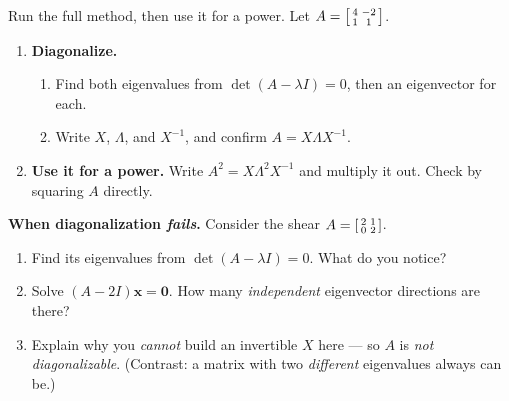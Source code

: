 \documentclass[10pt]{article}
\newcommand{\xx}{\mathbf{x}}
\newcommand{\zero}{\mathbf{0}}
\begin{document}
\begin{tcolorbox}[colback=white, colframe=black!40, title=\textbf{Tier A --- Approaching Proficiency},
    fonttitle=\bfseries, arc=1.5mm, left=3mm, right=3mm, top=2mm, bottom=2mm, breakable]
Run the full method, then use it for a power. Let $A=\begin{bsmallmatrix} 4 & -2\\ 1 & 1 \end{bsmallmatrix}$.
\begin{enumerate}[leftmargin=1.7em, itemsep=9pt]
  \item \textbf{Diagonalize.}
        \begin{enumerate}[label=(\alph*), leftmargin=1.7em, itemsep=3pt]
          \item Find both eigenvalues from $\det(A-\lambda I)=0$, then an eigenvector for each.
          \item Write $X$, $\Lambda$, and $X^{-1}$, and confirm $A=X\Lambda X^{-1}$.
        \end{enumerate}
  \item \textbf{Use it for a power.} Write $A^2=X\Lambda^2 X^{-1}$ and multiply it out. Check by squaring
        $A$ directly. 
\end{enumerate}
\end{tcolorbox}

\begin{tcolorbox}[colback=white, colframe=black!40, title=\textbf{Tier E --- Extension},
    fonttitle=\bfseries, arc=1.5mm, left=3mm, right=3mm, top=2mm, bottom=2mm, breakable]
\textbf{When diagonalization \emph{fails}.} Consider the shear $A=\begin{bsmallmatrix} 2 & 1\\ 0 & 2 \end{bsmallmatrix}$.
\begin{enumerate}[leftmargin=1.7em, itemsep=9pt]
  \item Find its eigenvalues from $\det(A-\lambda I)=0$. What do you notice? \writeline
  \item Solve $(A-2I)\xx=\zero$. How many \emph{independent} eigenvector directions are there? \writeline
  \item Explain why you \emph{cannot} build an invertible $X$ here --- so $A$ is \emph{not diagonalizable}.
        (Contrast: a matrix with two \emph{different} eigenvalues always can be.) 
\end{enumerate}
\end{tcolorbox}
\end{document}
